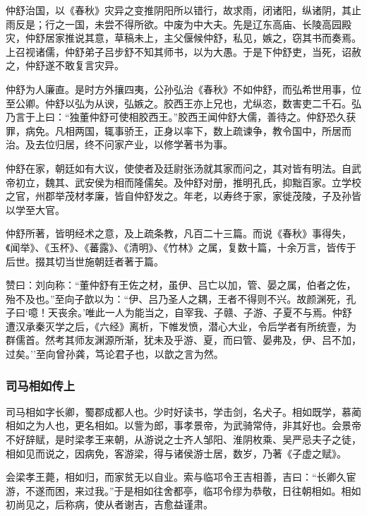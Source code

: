 \documentclass[]{article}
\begin{document}
仲舒治国，以《春秋》灾异之变推阴阳所以错行，故求雨，闭诸阳，纵诸阴，其止雨反是；行之一国，未尝不得所欲。中废为中大夫。先是辽东高庙、长陵高园殿灾，仲舒居家推说其意，草稿未上，主父偃候仲舒，私见，嫉之，窃其书而奏焉。上召视诸儒，仲舒弟子吕步舒不知其师书，以为大愚。于是下仲舒吏，当死，诏赦之，仲舒遂不敢复言灾异。

仲舒为人廉直。是时方外攘四夷，公孙弘治《春秋》不如仲舒，而弘希世用事，位至公卿。仲舒以弘为从谀，弘嫉之。胶西王亦上兄也，尤纵恣，数害吏二千石。弘乃言于上曰：``独董仲舒可使相胶西王。''胶西王闻仲舒大儒，善待之。仲舒恐久获罪，病免。凡相两国，辄事骄王，正身以率下，数上疏谏争，教令国中，所居而治。及去位归居，终不问家产业，以修学著书为事。

仲舒在家，朝廷如有大议，使使者及廷尉张汤就其家而问之，其对皆有明法。自武帝初立，魏其、武安侯为相而隆儒矣。及仲舒对册，推明孔氏，抑黜百家。立学校之官，州郡举茂材孝廉，皆自仲舒发之。年老，以寿终于家，家徙茂陵，子及孙皆以学至大官。

仲舒所著，皆明经术之意，及上疏条教，凡百二十三篇。而说《春秋》事得失，《闻举》、《玉杯》、《蕃露》、《清明》、《竹林》之属，复数十篇，十余万言，皆传于后世。掇其切当世施朝廷者著于篇。

赞曰：刘向称：``董仲舒有王佐之材，虽伊、吕亡以加，管、晏之属，伯者之佐，殆不及也。''至向子歆以为：``伊、吕乃圣人之耦，王者不得则不兴。故颜渊死，孔子曰`噫！天丧余。'唯此一人为能当之，自宰我、子赣、子游、子夏不与焉。仲舒遭汉承秦灭学之后，《六经》离析，下帷发愤，潜心大业，令后学者有所统壹，为群儒首。然考其师友渊源所渐，犹未及乎游、夏，而曰管、晏弗及，伊、吕不加，过矣。''至向曾孙龚，笃论君子也，以歆之言为然。

\hypertarget{header-n4535}{%
\subsubsection{司马相如传上}\label{header-n4535}}

司马相如字长卿，蜀郡成都人也。少时好读书，学击剑，名犬子。相如既学，慕蔺相如之为人也，更名相如。以訾为郎，事孝景帝，为武骑常侍，非其好也。会景帝不好辞赋，是时梁孝王来朝，从游说之士齐人邹阳、淮阴枚乘、吴严忌夫子之徒，相如见而说之，因病免，客游梁，得与诸侯游士居，数岁，乃著《子虚之赋》。

会梁孝王薨，相如归，而家贫无以自业。索与临邛令王吉相善，吉曰：``长卿久宦游，不遂而困，来过我。''于是相如往舍都亭，临邛令缪为恭敬，日往朝相如。相如初尚见之，后称病，使从者谢吉，吉愈益谨肃。
\end{document}
